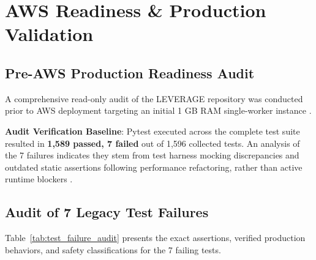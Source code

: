 \chapter{AWS Readiness \& Production Validation}
\label{ch:aws_readiness}

\section{Pre-AWS Production Readiness Audit}
A comprehensive read-only audit of the LEVERAGE repository was conducted prior to AWS deployment targeting an initial 1 GB RAM single-worker instance \cite{ref:factsheet}.

\begin{accuracybox}
\textbf{Audit Verification Baseline}: Pytest executed across the complete test suite resulted in \textbf{1,589 passed, 7 failed} out of 1,596 collected tests. An analysis of the 7 failures indicates they stem from test harness mocking discrepancies and outdated static assertions following performance refactoring, rather than active runtime blockers .
\end{accuracybox}

\section{Audit of 7 Legacy Test Failures}
Table~\ref{tab:test_failure_audit} presents the exact assertions, verified production behaviors, and safety classifications for the 7 failing tests.

